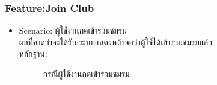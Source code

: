 \documentclass[14pt,oneside,openright,a4paper]{cpe-thai-project}
\begin{document}
\subsubsection{Feature:Join Club}
\begin{itemize}
  \item Scenario: ผู้ใช้งานกดเข้าร่วมชมรม
  \\ผลที่คาดว่าจะได้รับ:ระบบแสดงหน้าจอว่าผู้ใช้ได้เข้าร่วมชมรมแล้ว
  \\หลักฐาน:\\
  \begin{figure}[!h]\centering
    \setlength{\fboxrule}{0.5mm} %
    \setlength{\fboxsep}{0.5cm}
    \caption{กรณีผู้ใช้งานกดเข้าร่วมชมรม}\label{fig:FeedPageClubTest}
  \end{figure}
\end{itemize}

\newpage
\end{document}

